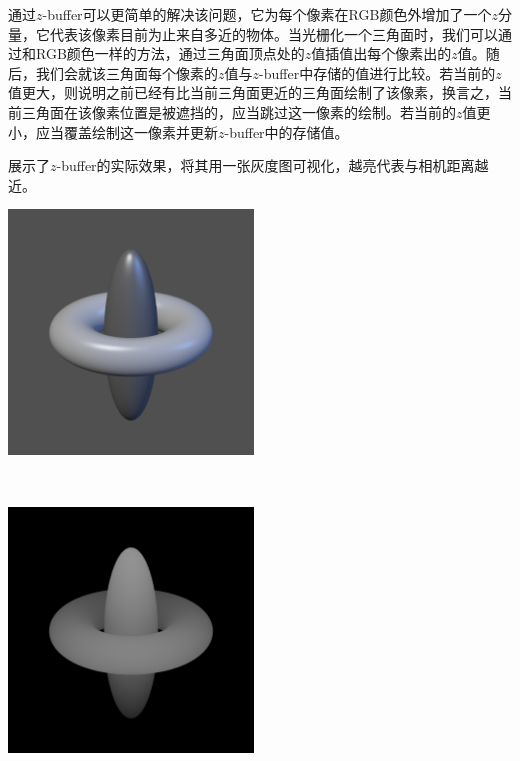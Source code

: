通过$z$-buffer可以更简单的解决该问题，它为每个像素在RGB颜色外增加了一个$z$分量，它代表该像素目前为止来自多近的物体。当光栅化一个三角面时，我们可以通过和RGB颜色一样的方法，通过三角面顶点处的$z$值插值出每个像素出的$z$值。随后，我们会就该三角面每个像素的$z$值与$z$-buffer中存储的值进行比较。若当前的$z$值更大，则说明之前已经有比当前三角面更近的三角面绘制了该像素，换言之，当前三角面在该像素位置是被遮挡的，应当跳过这一像素的绘制。若当前的$z$值更小，应当覆盖绘制这一像素并更新$z$-buffer中的存储值。

展示了$z$-buffer的实际效果，将其用一张灰度图可视化，越亮代表与相机距离越近。

\begin{Figure}[$z$-buffer的效果]
    \begin{FigureSub}[渲染图像]
        \includegraphics[width=6.5cm]{image/RasterizationIOW/SphereRing.png}
    \end{FigureSub}\\
    \vspace{0.5cm}
    \begin{FigureSub}
        \includegraphics[width=6.5cm]{image/RasterizationIOW/SphereRingZbuff.png}
    \end{FigureSub}
\end{Figure}

